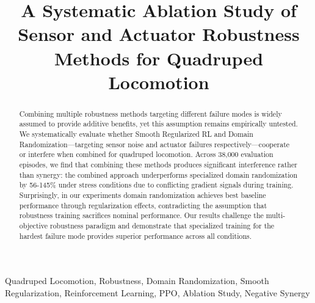\documentclass[conference]{IEEEtran}
\begin{document}
\title{A Systematic Ablation Study of Sensor and Actuator Robustness Methods for Quadruped Locomotion}

\author{
}

\maketitle

\begin{abstract}
Combining multiple robustness methods targeting different failure modes is widely assumed to provide additive benefits, yet this assumption remains empirically untested. We systematically evaluate whether Smooth Regularized RL and Domain Randomization—targeting sensor noise and actuator failures respectively—cooperate or interfere when combined for quadruped locomotion. Across 38,000 evaluation episodes, we find that combining these methods produces significant interference rather than synergy: the combined approach underperforms specialized domain randomization by 56-145\% under stress conditions due to conflicting gradient signals during training. Surprisingly, in our experiments domain randomization achieves best baseline performance through regularization effects, contradicting the assumption that robustness training sacrifices nominal performance. Our results challenge the multi-objective robustness paradigm and demonstrate that specialized training for the hardest failure mode provides superior performance across all conditions.
\end{abstract}

\begin{IEEEkeywords}
Quadruped Locomotion, Robustness, Domain Randomization, Smooth Regularization, Reinforcement Learning, PPO, Ablation Study, Negative Synergy
\end{IEEEkeywords}

\end{document}
